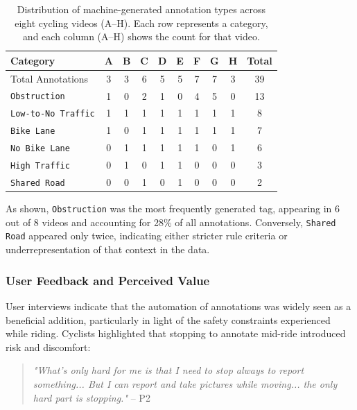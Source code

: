 \begin{table}[H]
\centering
\setlength{\tabcolsep}{4pt} %
\renewcommand{\arraystretch}{1.1} %
\begin{tabular}{|l|c|c|c|c|c|c|c|c|c|}
\hline
\textbf{Category} & \textbf{A} & \textbf{B} & \textbf{C} & \textbf{D} & \textbf{E} & \textbf{F} & \textbf{G} & \textbf{H} & \textbf{Total} \\
\hline
Total Annotations & 3 & 3 & 6 & 5 & 5 & 7 & 7 & 3 & 39 \\
\texttt{Obstruction} & 1 & 0 & 2 & 1 & 0 & 4 & 5 & 0 & 13 \\
\texttt{Low-to-No Traffic} & 1 & 1 & 1 & 1 & 1 & 1 & 1 & 1 & 8 \\
\texttt{Bike Lane} & 1 & 0 & 1 & 1 & 1 & 1 & 1 & 1 & 7 \\
\texttt{No Bike Lane} & 0 & 1 & 1 & 1 & 1 & 1 & 0 & 1 & 6 \\
\texttt{High Traffic} & 0 & 1 & 0 & 1 & 1 & 0 & 0 & 0 & 3 \\
\texttt{Shared Road} & 0 & 0 & 1 & 0 & 1 & 0 & 0 & 0 & 2 \\
\hline
\end{tabular}
\caption{Distribution of machine-generated annotation types across eight cycling videos (A–H). Each row represents a category, and each column (A–H) shows the count for that video.}
\label{tab:annotation_distribution}
\end{table}


As shown, \texttt{Obstruction} was the most frequently generated tag, appearing in 6 out of 8 videos and accounting for 28\% of all annotations. Conversely, \texttt{Shared Road} appeared only twice, indicating either stricter rule criteria or underrepresentation of that context in the data. 

\subsubsection*{User Feedback and Perceived Value}

User interviews indicate that the automation of annotations was widely seen as a beneficial addition, particularly in light of the safety constraints experienced while riding. Cyclists highlighted that stopping to annotate mid-ride introduced risk and discomfort:

\begin{quote}
\textit{"What's only hard for me is that I need to stop always to report something... But I can report and take pictures while moving... the only hard part is stopping."} -- P2
\end{quote}

